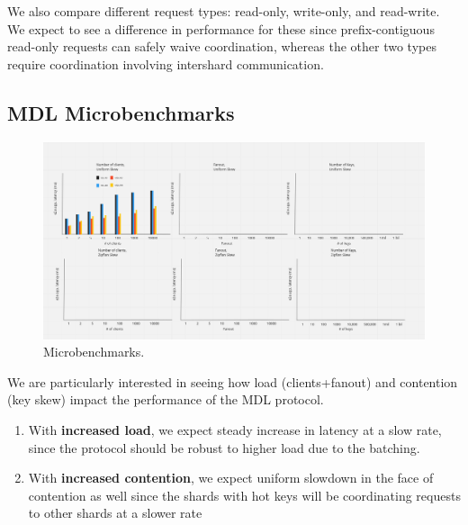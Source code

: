 
We also compare different request types: read-only, write-only, and read-write. We expect to see a difference in performance for these since prefix-contiguous read-only requests can safely waive coordination, whereas the other two types require coordination involving intershard communication.

\subsection{MDL Microbenchmarks}
\label{sec:micro}
\begin{figure}[hbt!]
\includegraphics[scale=.36]{microbenchmarks.png}
\caption{Microbenchmarks.}
\label{fig:microben}
\end{figure}

We are particularly interested in seeing how load (clients+fanout) and contention (key skew) impact the performance of the MDL protocol. 
\begin{enumerate}
    \item With \textbf{increased load}, we expect steady increase in latency at a slow rate, since the protocol should be robust to higher load due to the batching.
    \item With \textbf{increased contention}, we expect uniform slowdown in the face of contention as well since the shards with hot keys will be coordinating requests to other shards at a slower rate
\end{enumerate}  

